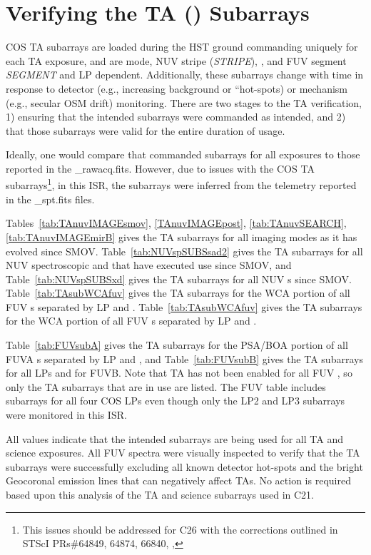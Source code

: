 \section{Verifying the TA (\tacq{}) Subarrays}\label{sec:subarray}

COS TA subarrays are loaded during the HST ground commanding uniquely for each TA exposure,
and are \tacq{} mode, NUV stripe (\textit{STRIPE}), \cenwave, and FUV segment \textit{SEGMENT} and LP dependent.
Additionally, these subarrays change with time in response to detector (e.g., increasing background or ``hot-spots)
or mechanism (e.g., secular OSM drift) monitoring.
There are two stages to the TA verification,
1) ensuring that the intended subarrays were commanded as intended, and
2) that those subarrays were valid for the entire duration of usage.

Ideally, one would compare that commanded subarrays for all exposures to those reported in the \textsf{\_rawacq.fits}.
However, due to issues with the COS TA subarrays\footnote{This issues should be addressed for C26 with the corrections outlined in STScI PRs\#64849, 64874, 66840, , },
in this ISR, the subarrays were inferred from the telemetry reported in the \textsf{\_spt.fits} files.

Tables~\ref{tab:TAnuvIMAGEsmov}, \ref{TAnuvIMAGEpost}, \ref{tab:TAnuvSEARCH}, \ref{tab:TAnuvIMAGEmirB} gives the TA subarrays for all imaging modes
as it has evolved since SMOV.
Table~\ref{tab:NUVspSUBSsad2} gives the TA subarrays for all NUV spectroscopic  and  that have executed use since SMOV, and
Table~\ref{tab:NUVspSUBSxd} gives the TA subarrays for all NUV s since SMOV.
Table~\ref{tab:TAsubWCAfuv} gives the TA subarrays for the WCA portion of all FUV s separated by LP and \cenwave.
Table~\ref{tab:TAsubWCAfuv} gives the TA subarrays for the WCA portion of all FUV s separated by LP and \cenwave.

Table~\ref{tab:FUVsubA} gives the TA subarrays for the PSA/BOA portion of all FUVA \tacq{}s separated by LP and \cenwave,
and Table~\ref{tab:FUVsubB} gives the TA subarrays for all LPs and \cenwaves for FUVB.
Note that TA has not been enabled for all FUV \cenwaves, so only the TA subarrays that are in use are listed.
The FUV table includes subarrays for all four COS LPs even though only the LP2 and LP3 subarrays were monitored in this ISR.

All values indicate that the intended subarrays are being used for all TA and science exposures. All FUV spectra were visually
inspected to verify that the TA subarrays were successfully excluding all known detector hot-spots and the
bright Geocoronal emission lines that can negatively affect TAs.  No action is required based upon this
analysis of the TA and science subarrays used in C21.

